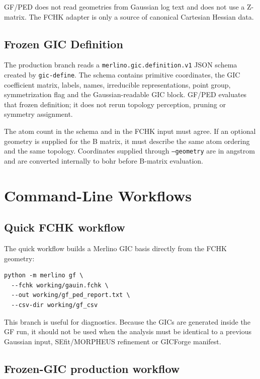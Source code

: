 \documentclass[11pt]{article}
\begin{document}
\noindent
GF/PED does not read geometries from Gaussian log text and does not use a
Z-matrix.  The FCHK adapter is only a source of canonical Cartesian Hessian
data.

\subsection{Frozen GIC Definition}

The production branch reads a \texttt{merlino.gic.definition.v1} JSON schema
created by \texttt{gic-define}.  The schema contains primitive coordinates, the
GIC coefficient matrix, labels, names, irreducible representations, point group,
symmetrization flag and the Gaussian-readable GIC block.  GF/PED evaluates that
frozen definition; it does not rerun topology perception, pruning or symmetry
assignment.

The atom count in the schema and in the FCHK input must agree.  If an optional
geometry is supplied for the B matrix, it must describe the same atom ordering
and the same topology.  Coordinates supplied through \texttt{--geometry} are in
angstrom and are converted internally to bohr before B-matrix evaluation.

\section{Command-Line Workflows}

\subsection{Quick FCHK workflow}

The quick workflow builds a Merlino GIC basis directly from the FCHK geometry:

\begin{lstlisting}[style=merlino]
python -m merlino gf \
  --fchk working/gauin.fchk \
  --out working/gf_ped_report.txt \
  --csv-dir working/gf_csv
\end{lstlisting}

\noindent
This branch is useful for diagnostics.  Because the GICs are generated inside
the GF run, it should not be used when the analysis must be identical to a
previous Gaussian input, SEfit/MORPHEUS refinement or GICForge manifest.

\subsection{Frozen-GIC production workflow}
\end{document}
